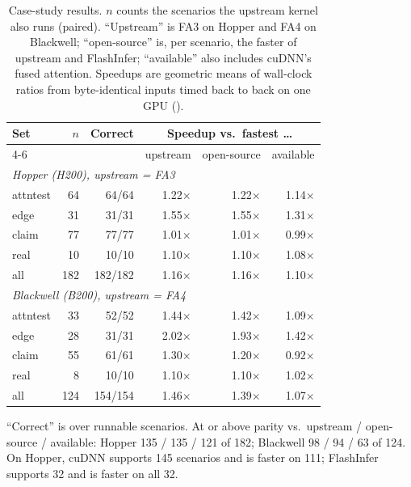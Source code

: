 \begin{table}[tbp]
\centering\small
\caption{Case-study results. $n$ counts the scenarios the upstream kernel also runs (paired).
``Upstream'' is FA3 on Hopper and FA4 on Blackwell; ``open-source'' is, per scenario, the faster of
upstream and FlashInfer; ``available'' also includes cuDNN's fused attention. Speedups are geometric
means of wall-clock ratios from byte-identical inputs timed back to back on one GPU
().}
\label{kernelseek:tab:casestudy}
\setlength{\tabcolsep}{6pt}
\begin{tabular}{lrrrrr}
\toprule
Set & $n$ & Correct & \multicolumn{3}{c}{Speedup vs.\ fastest \ldots} \\
\cmidrule(lr){4-6}
 & & & upstream & open-source & available \\
\midrule
\multicolumn{6}{l}{\emph{Hopper (H200), upstream = FA3}} \\
attntest   & 64  & 64/64   & 1.22$\times$ & 1.22$\times$ & 1.14$\times$ \\
edge       & 31  & 31/31   & 1.55$\times$ & 1.55$\times$ & 1.31$\times$ \\
claim      & 77  & 77/77   & 1.01$\times$ & 1.01$\times$ & 0.99$\times$ \\
real       & 10  & 10/10   & 1.10$\times$ & 1.10$\times$ & 1.08$\times$ \\
all        & 182 & 182/182 & 1.16$\times$ & 1.16$\times$ & 1.10$\times$ \\
\midrule
\multicolumn{6}{l}{\emph{Blackwell (B200), upstream = FA4}} \\
attntest   & 33  & 52/52   & 1.44$\times$ & 1.42$\times$ & 1.09$\times$ \\
edge       & 28  & 31/31   & 2.02$\times$ & 1.93$\times$ & 1.42$\times$ \\
claim      & 55  & 61/61   & 1.30$\times$ & 1.20$\times$ & 0.92$\times$ \\
real       & 8   & 10/10   & 1.10$\times$ & 1.10$\times$ & 1.02$\times$ \\
all        & 124 & 154/154 & 1.46$\times$ & 1.39$\times$ & 1.07$\times$ \\
\bottomrule
\end{tabular}

\raggedright\footnotesize ``Correct'' is over runnable scenarios. At or above parity vs.\ upstream /
open-source / available: Hopper 135 / 135 / 121 of 182; Blackwell 98 / 94 / 63 of 124. On Hopper,
cuDNN supports 145 scenarios and \ksFaThree is faster on 111; FlashInfer supports 32 and \ksFaThree is
faster on all 32.
\end{table}

